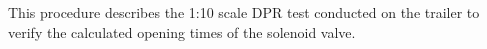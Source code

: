 This procedure describes the 1:10 scale DPR test conducted on the trailer to verify the calculated opening times of the solenoid valve. 
